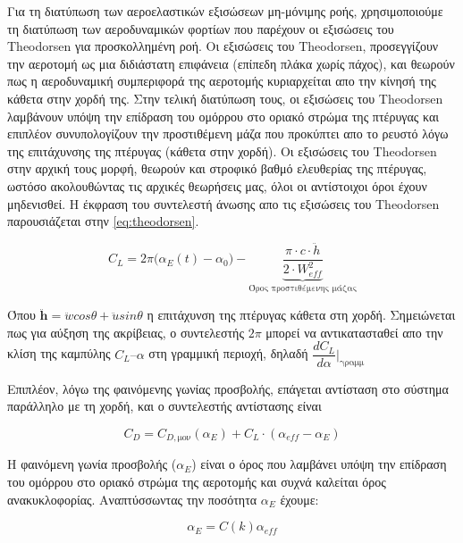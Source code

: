 Για τη διατύπωση των αεροελαστικών εξισώσεων μη-μόνιμης ροής, χρησιμοποιούμε τη διατύπωση των αεροδυναμικών φορτίων που παρέχουν οι εξισώσεις του Theodorsen για προσκολλημένη ροή. Οι εξισώσεις του Theodorsen, προσεγγίζουν την αεροτομή ως μια διδιάστατη επιφάνεια (επίπεδη πλάκα χωρίς πάχος), και θεωρούν πως η αεροδυναμική συμπεριφορά της αεροτομής κυριαρχείται απο την κίνησή της κάθετα στην χορδή της. Στην τελική διατύπωση τους, οι εξισώσεις του Theodorsen λαμβάνουν υπόψη την επίδραση του ομόρρου στο οριακό στρώμα της πτέρυγας και επιπλέον συνυπολογίζουν την προστιθέμενη μάζα που προκύπτει απο το ρευστό λόγω της επιτάχυνσης της πτέρυγας (κάθετα στην χορδή). Οι εξισώσεις του Theodorsen στην αρχική τους μορφή, θεωρούν και στροφικό βαθμό ελευθερίας της πτέρυγας, ωστόσο ακολουθώντας τις αρχικές θεωρήσεις μας, όλοι οι αντίστοιχοι όροι έχουν μηδενισθεί. Η έκφραση του συντελεστή άνωσης απο τις εξισώσεις του Theodorsen παρουσιάζεται στην \cref{eq:theodorsen}.

\begin{equation}
    C_L = 2\pi \Big(\alpha_{E}(t)-\alpha_0\Big) - \underbrace{\dfrac{\pi\cdot c\cdot \ddot{h}}{2\cdot W_{eff}^2}}_{\text{Όρος προστιθέμενης μάζας}}
    \label{eq:theodorsen}
\end{equation}

\noindent Όπου $\ddot{\mathbf{h}}=\ddot{w}cos\theta+\ddot{u}sin\theta$ η επιτάχυνση της πτέρυγας κάθετα στη χορδή.
Σημειώνεται πως για αύξηση της ακρίβειας, ο συντελεστής $2\pi$ μπορεί να αντικατασταθεί απο την κλίση της καμπύλης $C_L\text{--}\alpha$ στη γραμμική περιοχή, δηλαδή $\dfrac{dC_L}{d\alpha}\Bigg|_{\text{γραμμ}}$

\vspace{0.5cm}

Επιπλέον, λόγω της φαινόμενης γωνίας προσβολής, επάγεται αντίσταση στο σύστημα παράλληλο με τη χορδή, και ο συντελεστής αντίστασης είναι

\begin{equation}
    C_D = C_{D,\text{μον}}(\alpha_{E}) + C_L\cdot (\alpha_{eff}-\alpha_E)
\end{equation}

\noindent Η φαινόμενη γωνία προσβολής ($\alpha_E$) είναι ο όρος που λαμβάνει υπόψη την επίδραση του ομόρρου στο οριακό στρώμα της αεροτομής και συχνά καλείται όρος ανακυκλοφορίας. Αναπτύσσωντας την ποσότητα $\alpha_E$ έχουμε:

\begin{equation}
    \alpha_E = C(k)\alpha_{eff}
    \label{eq:ae}
\end{equation}


